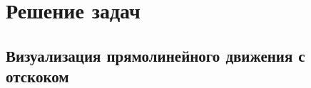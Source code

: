 \newpage
\chapter[Решение задач]{Решение задач}
\section[Визуализация прямолинейного движения с отскоком]{Визуализация прямолинейного движения с отскоком}
